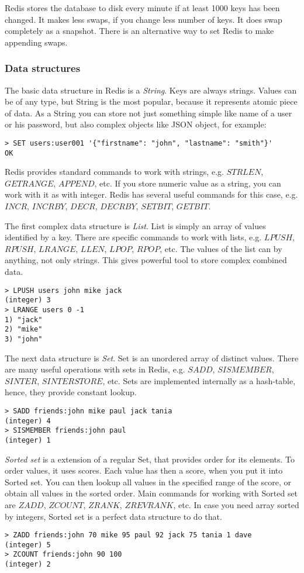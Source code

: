 Redis stores the database to disk every minute if at least 1000 keys has been changed.
It makes less swaps, if you change less number of keys.
It does swap completely as a snapshot.
There is an alternative way to set Redis to make appending swaps.

\subsubsection{Data structures}

The basic data structure in Redis is a \textit{String}.
Keys are always strings.
Values can be of any type, but String is the most popular, because it represents atomic piece of data.
As a String you can store not just something simple like name of a user or his password, but also complex objects like JSON object, for example:
\begin{verbatim}
> SET users:user001 '{"firstname": "john", "lastname": "smith"}'
OK
\end{verbatim}
Redis provides standard commands to work with strings, e.g. $STRLEN$, $GETRANGE$, $APPEND$, etc.
If you store numeric value as a string, you can work with it as with integer.
Redis has several useful commands for this case, e.g. $INCR$, $INCRBY$, $DECR$, $DECRBY$, $SETBIT$, $GETBIT$.

The first complex data structure is \textit{List}.
List is simply an array of values identified by a key.
There are specific commands to work with lists, e.g. $LPUSH$, $RPUSH$, $LRANGE$, $LLEN$, $LPOP$, $RPOP$, etc.
The values of the list can by anything, not only strings.
This gives powerful tool to store complex combined data.
\begin{verbatim}
> LPUSH users john mike jack
(integer) 3
> LRANGE users 0 -1
1) "jack"
2) "mike"
3) "john"
\end{verbatim}

The next data structure is \textit{Set}.
Set is an unordered array of distinct values.
There are many useful operations with sets in Redis, e.g. $SADD$, $SISMEMBER$, $SINTER$, $SINTERSTORE$, etc.
Sets are implemented internally as a hash-table, hence, they provide constant lookup.
\begin{verbatim}
> SADD friends:john mike paul jack tania
(integer) 4
> SISMEMBER friends:john paul
(integer) 1 
\end{verbatim}

\textit{Sorted set} is a extension of a regular Set, that provides order for its elements.
To order values, it uses scores.
Each value has then a score, when you put it into Sorted set.
You can then lookup all values in the specified range of the score, or obtain all values in the sorted order.
Main commands for working with Sorted set are $ZADD$, $ZCOUNT$, $ZRANK$, $ZREVRANK$, etc.
In case you need array sorted by integers, Sorted set is a perfect data structure to do that.
\begin{verbatim}
> ZADD friends:john 70 mike 95 paul 92 jack 75 tania 1 dave
(integer) 5
> ZCOUNT friends:john 90 100
(integer) 2
\end{verbatim}

